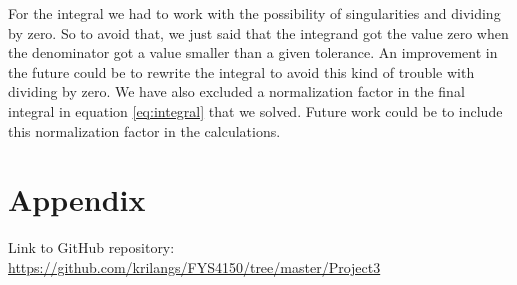 \documentclass[12pt,a4paper,english]{article}
\begin{document}
For the integral we had to work with the possibility of singularities and dividing by zero. So to avoid that, we just said that the integrand got the value zero when the denominator got a value smaller than a given tolerance. An improvement in the future could be to rewrite the integral to avoid this kind of trouble with dividing by zero. We have also excluded a normalization factor in the final integral in equation \ref{eq:integral} that we solved. Future work could be to include this normalization factor in the calculations.

\appendix
\section{Appendix}
\label{sect:appendix}
Link to GitHub repository:\\
\url{https://github.com/krilangs/FYS4150/tree/master/Project3}



\end{document}
